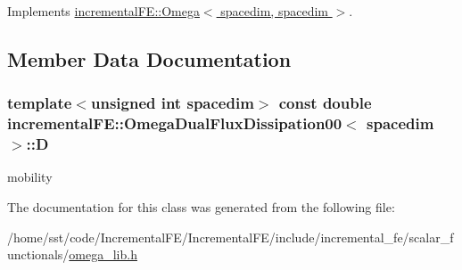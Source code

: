 Implements \hyperlink{classincremental_f_e_1_1_omega_3_01spacedim_00_01spacedim_01_4_a40131354ef0a28ca48a0e6c9ed33aa33}{incremental\+F\+E\+::\+Omega$<$ spacedim, spacedim $>$}.



\subsection{Member Data Documentation}
\subsubsection[{\texorpdfstring{D}{D}}]{\setlength{\rightskip}{0pt plus 5cm}template$<$unsigned int spacedim$>$ const double {\bf incremental\+F\+E\+::\+Omega\+Dual\+Flux\+Dissipation00}$<$ spacedim $>$\+::D\hspace{0.3cm}{\ttfamily [private]}}\hypertarget{classincremental_f_e_1_1_omega_dual_flux_dissipation00_a922910cdc92b29321d37bf46dc50f41a}{}\label{classincremental_f_e_1_1_omega_dual_flux_dissipation00_a922910cdc92b29321d37bf46dc50f41a}
mobility 

The documentation for this class was generated from the following file\+:\begin{DoxyCompactItemize}
\item 
/home/sst/code/\+Incremental\+F\+E/\+Incremental\+F\+E/include/incremental\+\_\+fe/scalar\+\_\+functionals/\hyperlink{omega__lib_8h}{omega\+\_\+lib.\+h}\end{DoxyCompactItemize}
